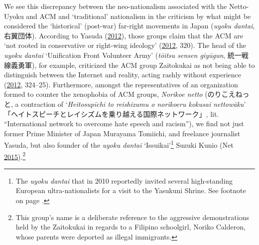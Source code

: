 \documentclass[10pt,british,A4paper,,openany]{memoir}
\makeatletter
\newcommand\footnoteref[1]{\protected@xdef\@thefnmark{\ref{#1}}\@footnotemark}
\makeatother
\begin{document}
We see this discrepancy between the neo-nationalism associated with the
Netto-Uyoku and ACM and `traditional' nationalism in the criticism by
what might be considered the `historical' (post-war) far-right movements
in Japan (\emph{uyoku dantai}, 右翼団体). According to Yasuda
(\protect\hyperlink{ref-yasuda_eng:_2012}{2012}), those groups claim
that the ACM are `not rooted in conservative or right-wing ideology'
(\protect\hyperlink{ref-yasuda_eng:_2012}{2012}, 320). The head of the
\emph{uyoku dantai} `Unification Front Volunteer Army' (\emph{tōitsu
sensen giyūgun}, 統一戦線義勇軍), for example, criticized the ACM group
Zaitokukai as not being able to distinguish between the Internet and
reality, acting rashly without experience
(\protect\hyperlink{ref-yasuda_eng:_2012}{2012}, 324--25). Furthermore,
amongst the representatives of an organization formed to counter the
xenophobia of ACM groups, \emph{Norikoe netto} (のりこえねっと, a
contraction of `\emph{Heitosupīchi to reishizumu o norikoeru kokusai
nettowāku}' 「ヘイトスピーチとレイシズムを乗り越える国際ネットワーク」,
lit. ``International network to overcome hate speech and racism''), we
find not just former Prime Minister of Japan Murayama Tomiichi, and
freelance journalist Yasuda, but also founder of the \emph{uyoku dantai}
`Issuikai'\footnote{The \emph{uyoku dantai} that in 2010 reportedly
  invited several high-standing European ultra-nationalists for a visit
  to the Yasukuni Shrine. See footnote \footnoteref{issuikai} on page
  \pageref{issuikai}.} Suzuki Kunio (Net
\protect\hyperlink{ref-net_norikoe_2015}{2015}).\footnote{This group's
  name is a deliberate reference to the aggressive demonstrations held
  by the Zaitokukai in regards to a Filipino schoolgirl, Noriko
  Calderon, whose parents were deported as illegal immigrants.}
\end{document}
